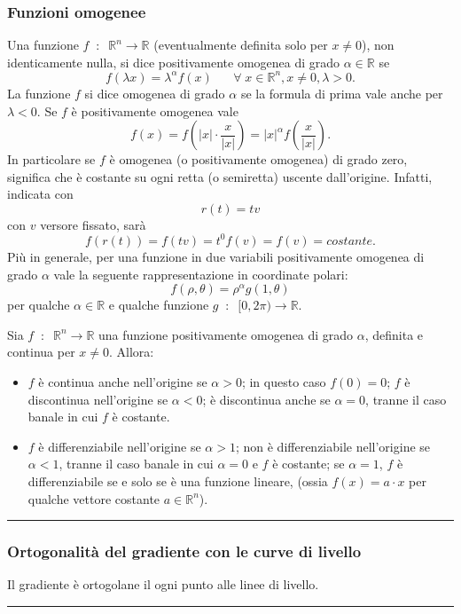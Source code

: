 \subsubsection*{Funzioni omogenee}
Una funzione $f \;\;:\;\; \mathbb{R}^n \rightarrow \mathbb{R}$ (eventualmente definita solo per $x\neq 0$), non identicamente nulla, si dice positivamente omogenea di grado $\alpha \in \mathbb{R}$ se
\[
    f(\lambda x) = \lambda^\alpha f(x) \;\;\;\;\; \;\forall\;x \in \mathbb{R}^n, x\neq 0, \lambda>0.
\]
La funzione $f$ si dice omogenea di grado $\alpha$ se la formula di prima vale anche per $\lambda<0$.\newline
Se $f$ è positivamente omogenea vale
\[
    f(x) = f( |x| \cdot \frac{x}{|x|}) = |x|^\alpha f(\frac{x}{|x|}).
\]
In particolare se $f$ è omogenea (o positivamente omogenea) di grado zero, significa che è costante su ogni retta (o semiretta) uscente dall'origine. Infatti, indicata con
\[
    r(t)=tv
\]
con $v$ versore fissato, sarà
\[
    f(r(t))=f(tv)=t^0f(v)=f(v)=costante.
\]
Più in generale, per una funzione in due variabili positivamente omogenea di grado $\alpha$ vale la seguente rappresentazione in coordinate polari:
\[
    f(\rho, \theta)=\rho^\alpha g(1,\theta)
\]
per qualche $\alpha \in \mathbb{R}$ e qualche funzione $g \;\;:\;\; [0, 2\pi) \rightarrow \mathbb{R}$.\newline

Sia $f \;\;:\;\; \mathbb{R}^n \rightarrow \mathbb{R}$ una funzione positivamente omogenea di grado $\alpha$, definita e continua per $x\neq 0$. Allora:
\begin{itemize}
    \item $f$ è continua anche nell'origine se $\alpha>0$; in questo caso $f(0) = 0$; $f$ è discontinua nell'origine se $\alpha<0$; è discontinua anche se $\alpha=0$, tranne il caso banale in cui $f$ è costante.
    \item $f$ è differenziabile nell'origine se $\alpha>1$; non è differenziabile nell'origine se $\alpha <1$, tranne il caso banale in cui $\alpha=0$ e $f$ è costante; se $\alpha=1$, $f$ è differenziabile se e solo se è una funzione lineare, (ossia $f(x) = a \cdot x$ per qualche vettore costante $a \in \mathbb{R}^n$).
\end{itemize}
\rule{\textwidth}{0.4pt}
\subsubsection*{Ortogonalità del gradiente con le curve di livello}
Il gradiente è ortogolane il ogni punto alle linee di livello. \newline
\rule{\textwidth}{0.4pt}
